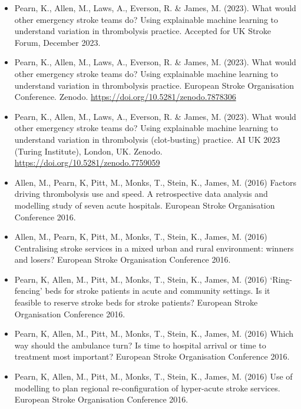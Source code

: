 \begin{itemize}
    \item Pearn, K., Allen, M., Laws, A., Everson, R. \& James, M. (2023). What would other emergency stroke teams do? Using explainable machine learning to understand variation in thrombolysis practice. Accepted for UK Stroke Forum, December 2023.
    
    \item Pearn, K., Allen, M., Laws, A., Everson, R. \& James, M. (2023). What would other emergency stroke teams do? Using explainable machine learning to understand variation in thrombolysis practice. European Stroke Organisation Conference. Zenodo. \url{https://doi.org/10.5281/zenodo.7878306}

    \item Pearn, K., Allen, M., Laws, A., Everson, R. \& James, M. (2023). What would other emergency stroke teams do? Using explainable machine learning to understand variation in thrombolysis (clot-busting) practice. AI UK 2023 (Turing Institute), London, UK. Zenodo. \url{https://doi.org/10.5281/zenodo.7759059}

    \item Allen, M., Pearn, K, Pitt, M., Monks, T., Stein, K., James, M. (2016) Factors driving thrombolysis use and speed. A retrospective data analysis and modelling study of seven acute hospitals. European Stroke Organisation Conference 2016. 

    \item Allen, M., Pearn, K, Pitt, M., Monks, T., Stein, K., James, M. (2016) Centralising stroke services in a mixed urban and rural environment: winners and losers? European Stroke Organisation Conference 2016.

    \item Pearn, K, Allen, M., Pitt, M., Monks, T., Stein, K., James, M. (2016) ‘Ring-fencing’ beds for stroke patients in acute and community settings. Is it feasible to reserve stroke beds for stroke patients? European Stroke Organisation Conference 2016. 

    \item Pearn, K, Allen, M., Pitt, M., Monks, T., Stein, K., James, M. (2016) Which way should the ambulance turn? Is time to hospital arrival or time to treatment most important? European Stroke Organisation Conference 2016. 

    \item Pearn, K, Allen, M., Pitt, M., Monks, T., Stein, K., James, M. (2016) Use of modelling to plan regional re-configuration of hyper-acute stroke services. European Stroke Organisation Conference 2016.

\end{itemize}

